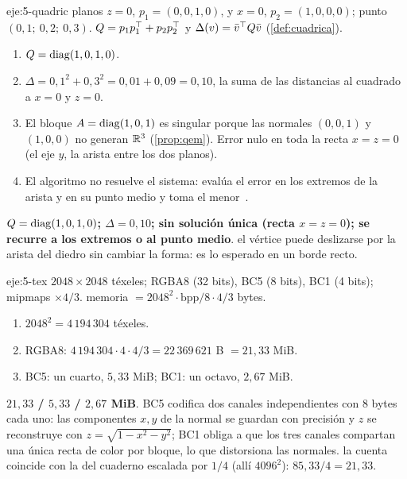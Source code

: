 \begin{solucion}{eje:5-quadric}
\datos planos $z=0$, $p_1=(0,0,1,0)$, y $x=0$, $p_2=(1,0,0,0)$; punto $(0{,}1;\ 0{,}2;\ 0{,}3)$.
\planteamiento $Q=p_1p_1^\top+p_2p_2^\top$ y $\Delta(v)=\bar v^\top Q\bar v$ (\cref{def:cuadrica}).
\pasos
\begin{enumerate}[label=\arabic*.]
  \item $Q=\operatorname{diag}(1,0,1,0)$.
  \item $\Delta=0{,}1^2+0{,}3^2=0{,}01+0{,}09=0{,}10$, la suma de las distancias al cuadrado a $x=0$ y $z=0$.
  \item El bloque $A=\operatorname{diag}(1,0,1)$ es singular porque las normales $(0,0,1)$ y $(1,0,0)$ no generan $\mathbb{R}^3$ (\cref{prop:qem}). Error nulo en toda la recta $x=z=0$ (el eje $y$, la arista entre los dos planos).
  \item El algoritmo no resuelve el sistema: evalúa el error en los extremos de la arista y en su punto medio y toma el menor~\cite[§4]{garland}.
\end{enumerate}
\resultado \textbf{$Q=\operatorname{diag}(1,0,1,0)$; $\Delta=0{,}10$; sin solución única (recta $x=z=0$); se recurre a los extremos o al punto medio}.
\comprobacion el vértice puede deslizarse por la arista del diedro sin cambiar la forma: es lo esperado en un borde recto.
\end{solucion}

\begin{solucion}{eje:5-tex}
\datos $2048\times 2048$ téxeles; RGBA8 (32 bits), BC5 (8 bits), BC1 (4 bits); mipmaps $\times 4/3$.
\planteamiento memoria $=2048^2\cdot\text{bpp}/8\cdot 4/3$ bytes.
\pasos
\begin{enumerate}[label=\arabic*.]
  \item $2048^2=4\,194\,304$ téxeles.
  \item RGBA8: $4\,194\,304\cdot 4\cdot 4/3=22\,369\,621$ B $=21{,}33$ MiB.
  \item BC5: un cuarto, $5{,}33$ MiB; BC1: un octavo, $2{,}67$ MiB.
\end{enumerate}
\resultado \textbf{$21{,}33$ / $5{,}33$ / $2{,}67$ MiB}. BC5 codifica dos canales independientes con 8 bytes cada uno: las componentes $x,y$ de la normal se guardan con precisión y $z$ se reconstruye con $z=\sqrt{1-x^2-y^2}$; BC1 obliga a que los tres canales compartan una única recta de color por bloque, lo que distorsiona las normales.
\comprobacion la cuenta coincide con la del cuaderno escalada por $1/4$ (allí $4096^2$): $85{,}33/4=21{,}33$.
\end{solucion}

